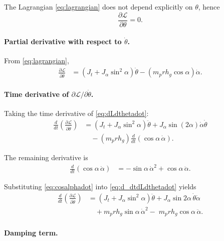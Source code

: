 \documentclass[12pt,a4paper]{article}
\begin{document}
The Lagrangian \eqref{eq:lagrangian} does not depend explicitly on $\theta$, hence
\begin{equation}
\frac{\partial\mathcal{L}}{\partial\theta}=0.
\label{eq:dLdtheta}
\end{equation}

\paragraph{Partial derivative with respect to $\dot\theta$.}

From \eqref{eq:lagrangian},
\begin{align}
\frac{\partial\mathcal{L}}{\partial\dot\theta}
&=
\left(J_t+J_\alpha\sin^2\alpha\right)\dot\theta
-\left(m_p r h_g\cos\alpha\right)\dot\alpha.
\label{eq:dLdthetadot}
\end{align}

\paragraph{Time derivative of $\partial\mathcal{L}/\partial\dot\theta$.}

Taking the time derivative of \eqref{eq:dLdthetadot}:
\begin{align}
\frac{d}{dt}\left(\frac{\partial\mathcal{L}}{\partial\dot\theta}\right)
&=
\left(J_t+J_\alpha\sin^2\alpha\right)\ddot\theta
+J_\alpha\sin(2\alpha)\dot\alpha\dot\theta
\nonumber\\
&\quad
-\left(m_p r h_g\right)\frac{d}{dt}\left(\cos\alpha\,\dot\alpha\right).
\label{eq:d_dtdLdthetadot}
\end{align}

The remaining derivative is
\begin{align}
\frac{d}{dt}\left(\cos\alpha\,\dot\alpha\right)
&=
-\sin\alpha\,\dot\alpha^2+\cos\alpha\,\ddot\alpha.
\label{eq:cosalphadot}
\end{align}

Substituting \eqref{eq:cosalphadot} into \eqref{eq:d_dtdLdthetadot} yields
\begin{align}
\frac{d}{dt}\left(\frac{\partial\mathcal{L}}{\partial\dot\theta}\right)
&=
\left(J_t+J_\alpha\sin^2\alpha\right)\ddot\theta
+J_\alpha\sin 2\alpha\,\dot\theta\dot\alpha
\nonumber\\
&\quad
+m_p r h_g\sin\alpha\,\dot\alpha^2
-\;m_p r h_g\cos\alpha\,\ddot\alpha.
\label{eq:d_dtdLdthetadot_final}
\end{align}

\paragraph{Damping term.}
\end{document}

